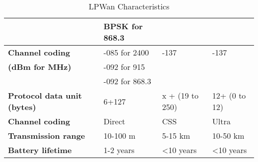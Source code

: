\begin{table}[h!]
\begin{center}
\begin{tabular}{l|l|l|l}
	\                                             & BPSK for 868.3 &                                 & \\\hline
	\bf{Channel coding}                            & -085 for 2400  & -137                            & -137         \\
	\bf{\footnotesize{(dBm for MHz)}}              & -092 for 915   &                                 & \\
	\                                              & -092 for 868.3 &                                 & \\\hline
	\bf{Protocol data unit \footnotesize{(bytes)}} & 6+127          & x + (19 to 250)                 & 12+ (0 to 12)\\\hline
	\bf{Channel coding}                            & Direct         & CSS                             & Ultra        \\\hline
	\bf{Transmission range}                        & 10-100 m       & 5-15 km                         & 10-50 km     \\\hline
	\bf{Battery lifetime}                          & 1-2 years      & <10 years                       & <10 years    \\\hline
	\end{tabular}
	\caption{\label{tab:LPWan_characteristics} LPWan Characteristics \cite{al-kashoash_comparison_2016}}
\end{center}
\end{table}
